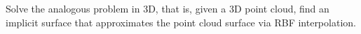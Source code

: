 Solve the analogous problem in 3D, that is, given a 3D point cloud, find an implicit surface that approximates the point
cloud surface via RBF interpolation.